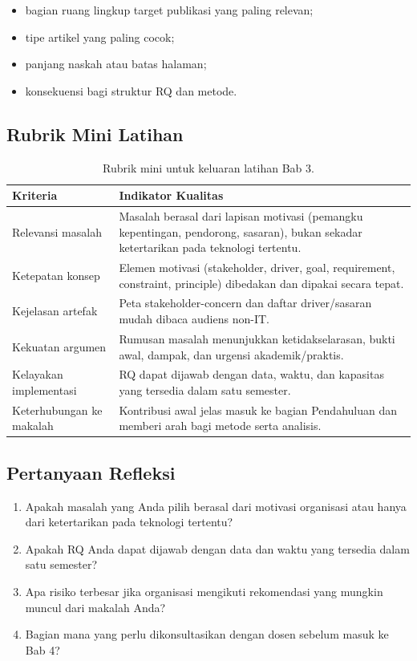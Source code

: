\begin{itemize}
  \item bagian ruang lingkup target publikasi yang paling relevan;
  \item tipe artikel yang paling cocok;
  \item panjang naskah atau batas halaman;
  \item konsekuensi bagi struktur RQ dan metode.
\end{itemize}

\subsection*{Rubrik Mini Latihan}

\begin{table}[htbp]
\centering
\scriptsize
\caption{Rubrik mini untuk keluaran latihan Bab 3.}
\label{tab:rubrik-latihan-bab2}
\begin{tabularx}{\textwidth}{@{}p{} X@{}}
\hline
\textbf{Kriteria} & \textbf{Indikator Kualitas} \\
\hline
Relevansi masalah & Masalah berasal dari lapisan motivasi (pemangku kepentingan,
pendorong, sasaran), bukan sekadar ketertarikan pada teknologi tertentu. \\
Ketepatan konsep & Elemen motivasi (stakeholder, driver, goal, requirement,
constraint, principle) dibedakan dan dipakai secara tepat. \\
Kejelasan artefak & Peta stakeholder-concern dan daftar driver/sasaran mudah
dibaca audiens non-IT. \\
Kekuatan argumen & Rumusan masalah menunjukkan ketidakselarasan, bukti awal,
dampak, dan urgensi akademik/praktis. \\
Kelayakan implementasi & RQ dapat dijawab dengan data, waktu, dan kapasitas
yang tersedia dalam satu semester. \\
Keterhubungan ke makalah & Kontribusi awal jelas masuk ke bagian Pendahuluan
dan memberi arah bagi metode serta analisis. \\
\hline
\end{tabularx}
\end{table}

\subsection*{Pertanyaan Refleksi}

\begin{enumerate}
  \item Apakah masalah yang Anda pilih berasal dari motivasi organisasi atau
        hanya dari ketertarikan pada teknologi tertentu?
  \item Apakah RQ Anda dapat dijawab dengan data dan waktu yang tersedia dalam
        satu semester?
  \item Apa risiko terbesar jika organisasi mengikuti rekomendasi yang mungkin
        muncul dari makalah Anda?
  \item Bagian mana yang perlu dikonsultasikan dengan dosen sebelum masuk ke
        Bab 4?
\end{enumerate}

